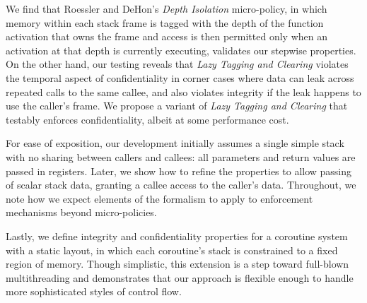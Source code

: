 \documentclass[10pt,conference]{ieeetran}%
\theoremstyle{definition}
\begin{document}
We find that Roessler and DeHon's {\em Depth Isolation} micro-policy, in
which memory within each stack frame is tagged with the depth of
the function activation that owns the frame and access is
then permitted only when an activation at that depth is currently executing, validates our
stepwise properties. On the other hand, our testing reveals that \emph{Lazy Tagging and Clearing}
violates the temporal aspect of confidentiality in
corner cases where data can leak across repeated calls to the same callee,
and also violates integrity if the leak happens to use the caller's frame. We
propose a variant of {\em Lazy Tagging and Clearing} that testably enforces
confidentiality, albeit at some performance cost.
%
\ifaftersubmission
{}
\fi

For ease of exposition, our development initially assumes a single simple
stack with no sharing between callers and callees: all parameters and return
values are passed in registers.  Later, we show how to refine the properties
to allow passing of scalar stack data, granting a callee access to the
caller's data. Throughout, we note how we expect elements of the formalism
to apply to enforcement mechanisms beyond micro-policies.

Lastly, we define integrity and confidentiality properties for a coroutine
system with a static layout, in which each coroutine's stack is constrained
to a fixed region of memory.  Though simplistic, this extension is a step
toward full-blown multithreading and demonstrates that our approach is flexible
enough to handle more sophisticated styles of control flow.
\end{document}
